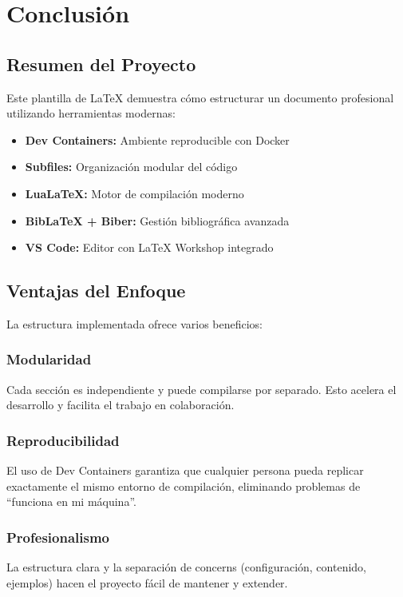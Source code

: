 \documentclass[/work/src/main.tex]{subfiles}
\begin{document}
\section{Conclusión}

\subsection{Resumen del Proyecto}
Este plantilla de LaTeX demuestra cómo estructurar un documento profesional utilizando herramientas modernas:

\begin{itemize}
    \item \textbf{Dev Containers:} Ambiente reproducible con Docker
    \item \textbf{Subfiles:} Organización modular del código
    \item \textbf{LuaLaTeX:} Motor de compilación moderno
    \item \textbf{BibLaTeX + Biber:} Gestión bibliográfica avanzada
    \item \textbf{VS Code:} Editor con LaTeX Workshop integrado
\end{itemize}

\subsection{Ventajas del Enfoque}
La estructura implementada ofrece varios beneficios:

\subsubsection{Modularidad}
Cada sección es independiente y puede compilarse por separado. Esto acelera el desarrollo y facilita el trabajo en colaboración.

\subsubsection{Reproducibilidad}
El uso de Dev Containers garantiza que cualquier persona pueda replicar exactamente el mismo entorno de compilación, eliminando problemas de ``funciona en mi máquina''.

\subsubsection{Profesionalismo}
La estructura clara y la separación de concerns (configuración, contenido, ejemplos) hacen el proyecto fácil de mantener y extender.
\end{document}
